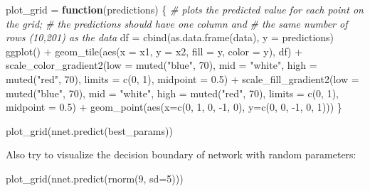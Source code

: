 \documentclass[
  a4paper,
]{article}
\newenvironment{Shaded}{\begin{snugshade}}{\end{snugshade}}
\newcommand{\AttributeTok}[1]{\textcolor[rgb]{0.77,0.63,0.00}{#1}}
\newcommand{\CommentTok}[1]{\textcolor[rgb]{0.56,0.35,0.01}{\textit{#1}}}
\newcommand{\ControlFlowTok}[1]{\textcolor[rgb]{0.13,0.29,0.53}{\textbf{#1}}}
\newcommand{\DecValTok}[1]{\textcolor[rgb]{0.00,0.00,0.81}{#1}}
\newcommand{\FloatTok}[1]{\textcolor[rgb]{0.00,0.00,0.81}{#1}}
\newcommand{\FunctionTok}[1]{\textcolor[rgb]{0.00,0.00,0.00}{#1}}
\newcommand{\NormalTok}[1]{#1}
\newcommand{\OtherTok}[1]{\textcolor[rgb]{0.56,0.35,0.01}{#1}}
\newcommand{\SpecialCharTok}[1]{\textcolor[rgb]{0.00,0.00,0.00}{#1}}
\newcommand{\StringTok}[1]{\textcolor[rgb]{0.31,0.60,0.02}{#1}}
\begin{document}
\begin{Shaded}
\begin{Highlighting}[]
\NormalTok{plot\_grid }\OtherTok{=} \ControlFlowTok{function}\NormalTok{(predictions) \{}
  \CommentTok{\# plots the predicted value for each point on the grid;}
  \CommentTok{\# the predictions should have one column and}
  \CommentTok{\# the same number of rows (10,201) as the data}
\NormalTok{  df }\OtherTok{=} \FunctionTok{cbind}\NormalTok{(}\FunctionTok{as.data.frame}\NormalTok{(data), }\AttributeTok{y =}\NormalTok{ predictions)}
  \FunctionTok{ggplot}\NormalTok{() }\SpecialCharTok{+}
    \FunctionTok{geom\_tile}\NormalTok{(}\FunctionTok{aes}\NormalTok{(}\AttributeTok{x =}\NormalTok{ x1, }\AttributeTok{y =}\NormalTok{ x2, }\AttributeTok{fill =}\NormalTok{ y, }\AttributeTok{color =}\NormalTok{ y), df) }\SpecialCharTok{+}
    \FunctionTok{scale\_color\_gradient2}\NormalTok{(}\AttributeTok{low =} \FunctionTok{muted}\NormalTok{(}\StringTok{"blue"}\NormalTok{, }\DecValTok{70}\NormalTok{), }\AttributeTok{mid =} \StringTok{"white"}\NormalTok{,}
                         \AttributeTok{high =} \FunctionTok{muted}\NormalTok{(}\StringTok{"red"}\NormalTok{, }\DecValTok{70}\NormalTok{), }\AttributeTok{limits =} \FunctionTok{c}\NormalTok{(}\DecValTok{0}\NormalTok{, }\DecValTok{1}\NormalTok{),}
                         \AttributeTok{midpoint =} \FloatTok{0.5}\NormalTok{) }\SpecialCharTok{+}
    \FunctionTok{scale\_fill\_gradient2}\NormalTok{(}\AttributeTok{low =} \FunctionTok{muted}\NormalTok{(}\StringTok{"blue"}\NormalTok{, }\DecValTok{70}\NormalTok{), }\AttributeTok{mid =} \StringTok{"white"}\NormalTok{,}
                        \AttributeTok{high =} \FunctionTok{muted}\NormalTok{(}\StringTok{"red"}\NormalTok{, }\DecValTok{70}\NormalTok{), }\AttributeTok{limits =} \FunctionTok{c}\NormalTok{(}\DecValTok{0}\NormalTok{, }\DecValTok{1}\NormalTok{),}
                        \AttributeTok{midpoint =} \FloatTok{0.5}\NormalTok{) }\SpecialCharTok{+}
    \FunctionTok{geom\_point}\NormalTok{(}\FunctionTok{aes}\NormalTok{(}\AttributeTok{x=}\FunctionTok{c}\NormalTok{(}\DecValTok{0}\NormalTok{, }\DecValTok{1}\NormalTok{, }\DecValTok{0}\NormalTok{, }\SpecialCharTok{{-}}\DecValTok{1}\NormalTok{, }\DecValTok{0}\NormalTok{), }\AttributeTok{y=}\FunctionTok{c}\NormalTok{(}\DecValTok{0}\NormalTok{, }\DecValTok{0}\NormalTok{, }\SpecialCharTok{{-}}\DecValTok{1}\NormalTok{, }\DecValTok{0}\NormalTok{, }\DecValTok{1}\NormalTok{)))}
\NormalTok{\}}

\FunctionTok{plot\_grid}\NormalTok{(}\FunctionTok{nnet.predict}\NormalTok{(best\_params))}
\end{Highlighting}
\end{Shaded}

Also try to visualize the decision boundary of network with random
parameters:

\begin{Shaded}
\begin{Highlighting}[]
\FunctionTok{plot\_grid}\NormalTok{(}\FunctionTok{nnet.predict}\NormalTok{(}\FunctionTok{rnorm}\NormalTok{(}\DecValTok{9}\NormalTok{, }\AttributeTok{sd=}\DecValTok{5}\NormalTok{)))}
\end{Highlighting}
\end{Shaded}
\end{document}

